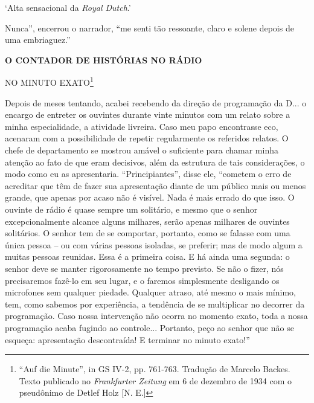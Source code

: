 `Alta sensacional da \emph{Royal Dutch}.'

Nunca'', encerrou o narrador, ``me senti tão ressoante, claro e solene
depois de uma embriaguez.''

\textbf{O CONTADOR DE HISTÓRIAS NO RÁDIO}

NO MINUTO EXATO\footnote{``Auf die Minute'', in GS IV-2, pp. 761-763.
  Tradução de Marcelo Backes. Texto publicado no \emph{Frankfurter
  Zeitung} em 6 de dezembro de 1934 com o pseudônimo de Detlef Holz
  {[}N. E.{]}}

Depois de meses tentando, acabei recebendo da direção de programação da
D... o encargo de entreter os ouvintes durante vinte minutos com um
relato sobre a minha especialidade, a atividade livreira. Caso meu papo
encontrasse eco, acenaram com a possibilidade de repetir regularmente os
referidos relatos. O chefe de departamento se mostrou amável o
suficiente para chamar minha atenção ao fato de que eram decisivos, além
da estrutura de tais considerações, o modo como eu as apresentaria.
``Principiantes'', disse ele, ``cometem o erro de acreditar que têm de
fazer sua apresentação diante de um público mais ou menos grande, que
apenas por acaso não é visível. Nada é mais errado do que isso. O
ouvinte de rádio é quase sempre um solitário, e mesmo que o senhor
excepcionalmente alcance alguns milhares, serão apenas milhares de
ouvintes solitários. O senhor tem de se comportar, portanto, como se
falasse com uma única pessoa -- ou com várias pessoas isoladas, se
preferir; mas de modo algum a muitas pessoas reunidas. Essa é a primeira
coisa. E há ainda uma segunda: o senhor deve se manter rigorosamente no
tempo previsto. Se não o fizer, nós precisaremos fazê-lo em seu lugar, e
o faremos simplesmente desligando os microfones sem qualquer piedade.
Qualquer atraso, até mesmo o mais mínimo, tem, como sabemos por
experiência, a tendência de se multiplicar no decorrer da programação.
Caso nossa intervenção não ocorra no momento exato, toda a nossa
programação acaba fugindo ao controle... Portanto, peço ao senhor que
não se esqueça: apresentação descontraída! E terminar no minuto exato!''


